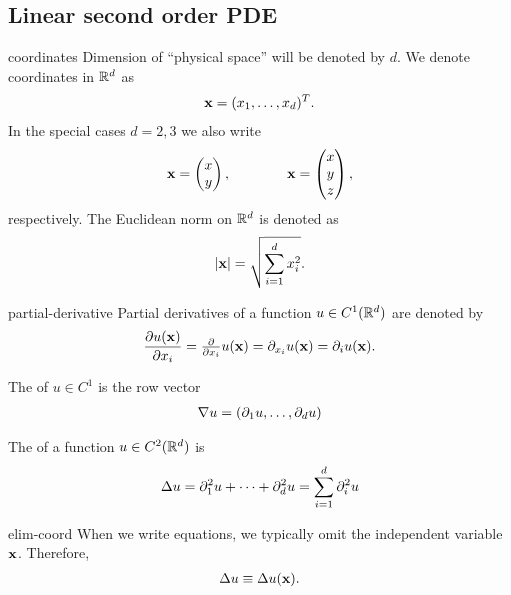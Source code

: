 \subsection{Linear second order PDE}

\begin{Notation}{coordinates}
  Dimension of ``physical space'' will be denoted by $d$.  We denote
  coordinates in $\mathbb R^d$ as
  \begin{gather*}
    \mathbf x = (x_1,\dots,x_d)^T  .
  \end{gather*}
  In the special cases $d=2,3$ we also write
  \begin{gather*}
  \mathbf x =
  \begin{pmatrix}
    x\\y
  \end{pmatrix},
  \qquad\qquad
  \mathbf x = \begin{pmatrix}
    x\\y\\z
  \end{pmatrix},
  \end{gather*}
  respectively.
  The Euclidean norm on $\mathbb R^d$ is denoted as
  \begin{gather*}
     \lvert\mathbf x\rvert = \sqrt{\sum_{i=1}^d x_i^2}.
  \end{gather*}
\end{Notation}

\begin{Notation}{partial-derivative}
  Partial derivatives of a function $u\in C^1(\mathbb R^d)$ are denoted by
  \begin{gather*}
    \frac{\partial u(\mathbf x)}{\partial x_i} = \tfrac{\partial}{\partial x_i} u(\mathbf x)
    = \partial_{x_i} u(\mathbf x) = \partial_i u(\mathbf x).
  \end{gather*}

  The  of $u \in C^1$ is the row vector
  \begin{gather*}
    \nabla u = (\partial_1u,\dots,\partial_du)
  \end{gather*}

  The  of a function $u\in C^2(\mathbb R^d)$ is
  \begin{gather*}
    \Delta u = \partial_1^2 u + \dots + \partial_d^2 u = \sum_{i=1}^d \partial_i^2 u
  \end{gather*}
\end{Notation}

\begin{Notation}{elim-coord}
  When we write equations, we typically omit the independent variable
  $\mathbf x$. Therefore,
  \begin{gather*}
    \Delta u \equiv \Delta u(\mathbf x).
  \end{gather*}
\end{Notation}

